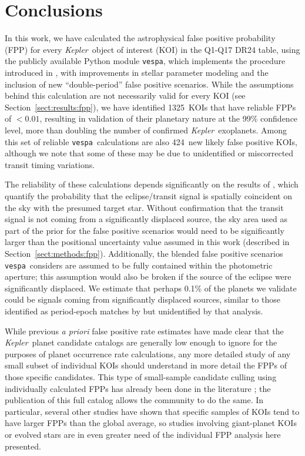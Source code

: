 \documentclass{emulateapj}
\newcommand{\sectionname}{Section}
\newcommand{\Sect}[1]{\sectionname~\ref{sect:#1}}
\newcommand{\sect}[1]{\Sect{#1}}
\newcommand{\sectlabel}[1]{\label{sect:#1}}
\newcommand{\nvalnew}{1325} %
\newcommand{\nfpnew}{424}  %
\newcommand{\kepler}{\textit{Kepler}}
\newcommand{\vespa}{\texttt{vespa}}
\begin{document}



\section{Conclusions}
\sectlabel{conclusions}

In this work, we have calculated the astrophysical false positive
probability (FPP) for every \kepler\ object of interest (KOI) in the
Q1-Q17 DR24 table, using the publicly available Python module
\vespa, which implements the procedure introduced in
\citet{Morton:2012}, with improvements in stellar parameter modeling
and the inclusion of new ``double-period'' false positive scenarios.
While the assumptions behind this calculation are not necessarily
valid for every KOI (see \sect{results:fpp}), we have identified
\nvalnew\ KOIs that have reliable FPPs of $< 0.01$, resulting in
validation of their planetary nature at the 99\% confidence level,
more than doubling the number of confirmed \kepler\ exoplanets.  Among
this set of reliable \vespa\ calculations are also \nfpnew\ new likely
false positive KOIs, although we note that some of these may be due to
unidentified or miscorrected transit timing variations.  

The reliability of these calculations depends significantly on the
results of \citet{Bryson:KSCI}, which quantify the probability that
the eclipse/transit signal is spatially coincident on the sky with the
presumed target star.  Without confirmation that the transit signal is
not coming from a significantly displaced source, the sky area used as
part of the prior for the false positive scenarios would need to be
significantly larger than the positional uncertainty value assumed in
this work (described in \sect{methods:fpp}).  Additionally, the
blended false positive scenarios \vespa\ considers are assumed to be
fully contained within the photometric aperture; this assumption would
also be broken if the source of the eclipse were significantly
displaced.  We estimate that perhaps 0.1\% of the planets we validate
could be signals coming from significantly displaced sources, similar 
to those identified as period-epoch matches by \citet{Coughlin:2014}
but unidentified by that analysis.

While previous \emph{a priori} false positive rate estimates
\citep{Morton:2011b,Fressin:2013} have made clear that the \kepler\
planet candidate catalogs are generally low enough to ignore for the
purposes of planet occurrence rate calculations, any more detailed
study of any small subset of individual KOIs should understand in more
detail the FPPs of those specific candidates.  This type of small-sample 
candidate culling using individually calculated FPPs has
already been done in the literature
\citep{MortonSwift:2014,MortonWinn:2014}; the publication of this full
catalog allows the community to do the same.  In particular, several
other studies have shown that specific samples of KOIs tend to have
larger FPPs than the global average, so studies involving giant-planet
KOIs \citep{Santerne:2015} or evolved stars \citep{Sliski:2014} are in
even greater need of the individual FPP analysis here presented.
\end{document}
